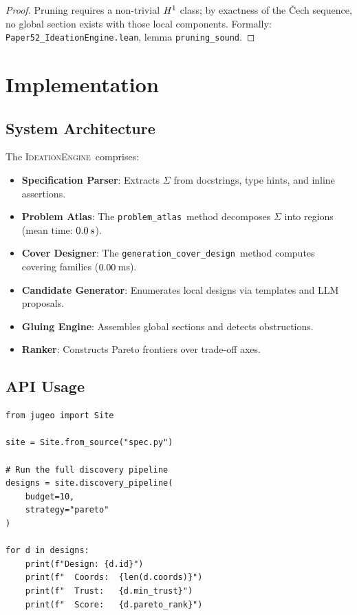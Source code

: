 \documentclass[11pt]{article}
\newcommand{\IdeationEngine}{\textsc{IdeationEngine}}
\newcommand{\GenCover}{\texttt{generation\_cover\_design}}
\newcommand{\ProbAtlas}{\texttt{problem\_atlas}}
\begin{document}
\begin{proof}
Pruning requires a non-trivial $H^{1}$ class; by exactness of
the \v{C}ech sequence, no global section exists with those local
components.  Formally: \texttt{Paper52\_IdeationEngine.lean}, lemma
\texttt{pruning\_sound}.
\end{proof}

\section{Implementation}\label{sec:implementation}

\subsection{System Architecture}
The \IdeationEngine\ comprises:
\begin{itemize}[noitemsep]
  \item \textbf{Specification Parser}: Extracts $\Sigma$ from
        docstrings, type hints, and inline assertions.
  \item \textbf{Problem Atlas}: The \ProbAtlas\ method decomposes
        $\Sigma$ into regions (mean time: $0.0\,s$).
  \item \textbf{Cover Designer}: The \GenCover\ method computes
        covering families ($0.00$\,ms).
  \item \textbf{Candidate Generator}: Enumerates local designs via
        templates and LLM proposals.
  \item \textbf{Gluing Engine}: Assembles global sections and
        detects obstructions.
  \item \textbf{Ranker}: Constructs Pareto frontiers over trade-off
        axes.
\end{itemize}

\subsection{API Usage}
\begin{lstlisting}[style=jugeo-python]
from jugeo import Site

site = Site.from_source("spec.py")

# Run the full discovery pipeline
designs = site.discovery_pipeline(
    budget=10,
    strategy="pareto"
)

for d in designs:
    print(f"Design: {d.id}")
    print(f"  Coords:  {len(d.coords)}")
    print(f"  Trust:   {d.min_trust}")
    print(f"  Score:   {d.pareto_rank}")
\end{lstlisting}
\end{document}
